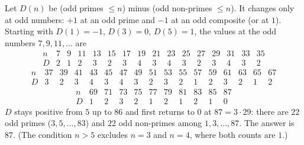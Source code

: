 Let $D(n)$ be (odd primes $\le n$) minus (odd non-primes $\le n$). It changes only at odd numbers: $+1$ at an odd prime and $-1$ at an odd composite (or at $1$). Starting with $D(1)=-1$, $D(3)=0$, $D(5)=1$, the values at the odd numbers $7,9,11,\dots$ are
\[
\begin{array}{c|ccccccccccccccc}
n&7&9&11&13&15&17&19&21&23&25&27&29&31&33&35\\\hline
D&2&1&2&3&2&3&4&3&4&3&2&3&4&3&2
\end{array}
\]
\[
\begin{array}{c|cccccccccccccccc}
n&37&39&41&43&45&47&49&51&53&55&57&59&61&63&65&67\\\hline
D&3&2&3&4&3&4&3&2&3&2&1&2&3&2&1&2
\end{array}
\]
\[
\begin{array}{c|cccccccccc}
n&69&71&73&75&77&79&81&83&85&87\\\hline
D&1&2&3&2&1&2&1&2&1&0
\end{array}
\]
$D$ stays positive from $5$ up to $86$ and first returns to $0$ at $87=3\cdot29$: there are $22$ odd primes ($3,5,\dots,83$) and $22$ odd non-primes among $1,3,\dots,87$. The answer is $\boxed{87}$. (The condition $n>5$ excludes $n=3$ and $n=4$, where both counts are $1$.)
